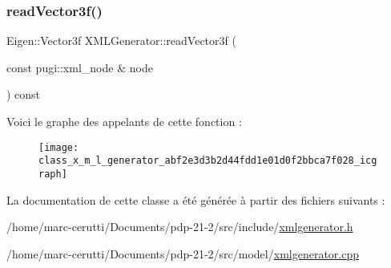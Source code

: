 \subsubsection{\texorpdfstring{read\+Vector3f()}{readVector3f()}}
{\footnotesize\ttfamily Eigen\+::\+Vector3f X\+M\+L\+Generator\+::read\+Vector3f (\begin{DoxyParamCaption}\item[{const pugi\+::xml\+\_\+node \&}]{node }\end{DoxyParamCaption}) const\hspace{0.3cm}{\ttfamily [private]}}

Voici le graphe des appelants de cette fonction \+:\nopagebreak
\begin{figure}[H]
\begin{center}
\leavevmode
\texttt{[image: class\_x\_m\_l\_generator\_abf2e3d3b2d44fdd1e01d0f2bbca7f028\_icgraph]}
\end{center}
\end{figure}


La documentation de cette classe a été générée à partir des fichiers suivants \+:\begin{DoxyCompactItemize}
\item 
/home/marc-\/cerutti/\+Documents/pdp-\/21-\/2/src/include/\hyperlink{xmlgenerator_8h}{xmlgenerator.\+h}\item 
/home/marc-\/cerutti/\+Documents/pdp-\/21-\/2/src/model/\hyperlink{xmlgenerator_8cpp}{xmlgenerator.\+cpp}\end{DoxyCompactItemize}
